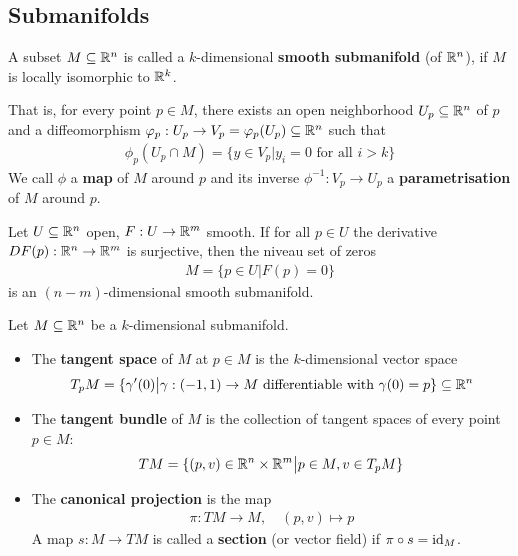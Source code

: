 \subsection{Submanifolds}

\begin{bdfn}[]
  A subset $M \subseteq \mathbb{R}^{n}$ is called a $k$-dimensional \textbf{smooth submanifold} (of $\mathbb{R}^{n}$), if $M$ is locally isomorphic to $\mathbb{R}^{k}$.

  That is, for every point $p \in M$, there exists an open neighborhood $U_p \subseteq \mathbb{R}^{n}$ of $p$ and a diffeomorphism $\varphi_p: U_p \to V_p = \varphi_p(U_p) \subseteq \mathbb{R}^{n}$ such that
  \begin{align*}
    \phi_p(U_p \cap M) = \{y \in V_p \big\vert y_i = 0 \text{ for all } i > k\}
  \end{align*}
  We call $\phi$ a \textbf{map} of $M$ around $p$ and its inverse $\phi^{-1}: V_p \to  U_p$ a \textbf{parametrisation} of $M$ around $p$.
\end{bdfn}


\begin{bthm}
Let $U \subseteq \mathbb{R}^{n}$ open, $F: U \to  \mathbb{R}^{m}$ smooth.
If for all $p \in U$ the derivative $DF(p): \mathbb{R}^{n} \to  \mathbb{R}^{m}$ is surjective, then the niveau set of zeros
\begin{align*}
  M = \{p \in U \big\vert F(p) = 0\}
\end{align*}
is an $(n-m)$-dimensional smooth submanifold.
\end{bthm}

\begin{bdfn}[]
Let $M \subseteq \mathbb{R}^{n}$ be a $k$-dimensional submanifold.
\begin{itemize}
  \item The \textbf{tangent space} of $M$ at $p \in M$ is the $k$-dimensional vector space
    \begin{align*}
      T_pM = \{\gamma'(0) \big\vert \gamma: (-1,1) \to  M \text{ differentiable with } \gamma(0) = p\} \subseteq \mathbb{R}^{n}
    \end{align*}
  \item The \textbf{tangent bundle} of $M$ is the collection of tangent spaces of every point $p \in M$:
    \begin{align*}
      TM = \{(p,v) \in \mathbb{R}^{n} \times \mathbb{R}^{m} \big\vert p \in M, v \in T_pM\}
    \end{align*}
  \item The \textbf{canonical projection} is the map
    \begin{align*}
      \pi: TM \to  M, \quad (p,v) \mapsto p
    \end{align*}
    A map $s: M \to  TM$ is called a \textbf{section} (or vector field) if $\pi \circ s = \operatorname{id}_M$.
    \begin{center}
    \end{center}
\end{itemize}
\end{bdfn}

